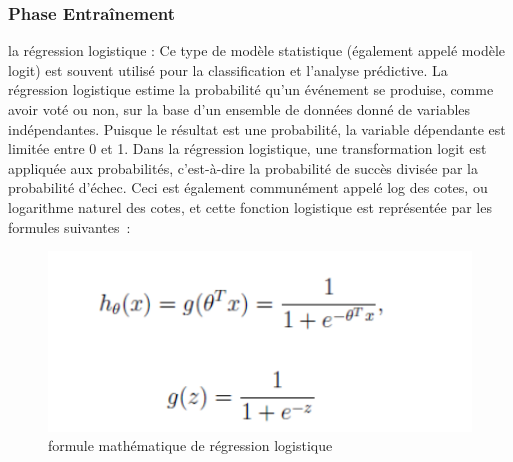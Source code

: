 \documentclass[a4paper,12pt]{report}
\begin{document}
\subsubsection{Phase Entraînement }
\textcolor{colortxt}{la régression logistique :}\cite{hosmer2013applied}
Ce type de modèle statistique (également appelé modèle logit) est souvent utilisé pour la classification et l'analyse prédictive. La régression logistique estime la probabilité qu'un événement se produise, comme avoir voté ou non, sur la base d'un ensemble de données donné de variables indépendantes. Puisque le résultat est une probabilité, la variable dépendante est limitée entre 0 et 1. Dans la régression logistique, une transformation logit est appliquée aux probabilités, c'est-à-dire la probabilité de succès divisée par la probabilité d'échec. Ceci est également communément appelé log des cotes, ou logarithme naturel des cotes, et cette fonction logistique est représentée par les formules suivantes :
\begin{figure}[H]
\centering
 \includegraphics[scale=0.9]{outils-images/data12.png}
\caption{formule mathématique de régression logistique}
\end{figure}
\end{document}
